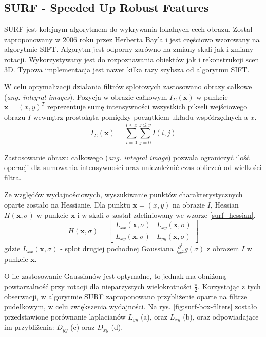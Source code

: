 \subsection{SURF - Speeded Up Robust Features}

SURF jest kolejnym algorytmem do wykrywania lokalnych cech obrazu. Został zaproponowany w 2006 roku przez Herberta Bay'a i jest częściowo wzorowany na algorytmie SIFT.\cite{BAY08} Algorytm jest odporny zarówno na zmiany skali jak i zmiany rotacji. Wykorzystywany jest do rozpoznawania obiektów jak i rekonstrukcji scen 3D. Typowa implementacja jest nawet kilka razy szybsza od algorytmu SIFT.\cite{SCHWEIGER09}

W celu optymalizacji działania filtrów splotowych zastosowano obrazy całkowe (\emph{ang. integral images}). Pozycja w obrazie całkowym $I_{\Sigma}(\boldsymbol{x})$ w punkcie $\boldsymbol{x}=(x, y)^T$ reprezentuje sumę intensywności wszystkich pikseli wejściowego obrazu $I$ wewnątrz prostokąta pomiędzy początkiem układu współrzędnych a $x$.
\begin{equation} 
\label{surf_integral_image} 
I_{\Sigma}(\boldsymbol{x}) = \sum\limits_{i=0}^{i \leq x} \sum\limits_{j=0}^{j \leq y} I(i,j)
\end{equation}

Zastosowanie obrazu całkowego (\emph{ang. integral image}) pozwala ograniczyć ilość operacji dla sumowania intensywności oraz uniezależnić czas obliczeń od wielkości filtra.\cite{BAY08}

Ze względów wydajnościowych, wyszukiwanie punktów charakterystycznych oparte zostało na Hessianie. Dla punktu $\boldsymbol{x}=(x, y)$ na obrazie $I$, Hessian $H(\boldsymbol{x}, \sigma)$ w punkcie $\boldsymbol{x}$ i w skali $\sigma$ został zdefiniowany we wzorze \ref{surf_hessian}.
\begin{equation} 
\label{surf_hessian} 
H(\boldsymbol{x}, \sigma) = 
	\begin{bmatrix}
		L_{xx}(\boldsymbol{x}, \sigma) & L_{xy}(\boldsymbol{x}, \sigma) \\
		L_{xy}(\boldsymbol{x}, \sigma) & L_{yy}(\boldsymbol{x}, \sigma)
	\end{bmatrix}
\end{equation} gdzie $L_{xx}(\boldsymbol{x}, \sigma)$ - splot drugiej pochodnej Gaussiana $\frac{\partial^2}{\partial x^2} g(\sigma)$ z obrazem $I$ w punkcie $\boldsymbol{x}$.

O ile zastosowanie Gaussianów jest optymalne\cite{LINDENBERG90}, to jednak ma obniżoną powtarzalność przy rotacji dla nieparzystych wielokrotności $\frac{\pi}{2}$. Korzystając z tych obserwacji, w algorytmie SURF zaproponowano przybliżenie oparte na filtrze pudełkowym, w celu zwiększenia wydajności. Na rys. \ref{fig:surf-box-filters} zostało przedstawione porównanie laplacianów $L_{yy}$ (a), oraz $L_{xy}$ (b), oraz odpowiadające im przybliżenia: $D_{yy}$ (c) oraz $D_{xy}$ (d).


